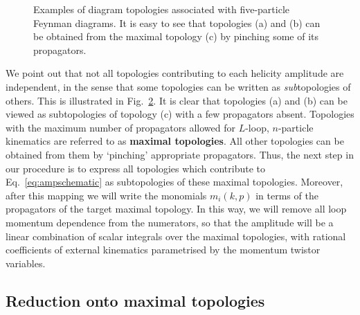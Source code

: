 \documentclass[main.tex]{subfiles}
\begin{document}
\begin{figure}
\begin{subfigure}[b]{0.3\textwidth}
    \caption{} \label{fig:topologyc}
    \end{subfigure}
\caption{Examples of diagram topologies associated with five-particle Feynman diagrams. It is easy to see that topologies (a) and (b) can be obtained from the maximal topology (c) by pinching some of its propagators.}
\label{fig:topologies}
\end{figure}

We point out that not all topologies contributing to each helicity amplitude are independent, in the sense that some topologies can be written as \textit{sub}topologies of others. This is illustrated in Fig.~\ref{fig:topologies}. It is clear that topologies (a) and (b) can be viewed as subtopologies of topology (c) with a few propagators absent. Topologies with the maximum number of propagators allowed for $L$-loop, $n$-particle kinematics are referred to as \textbf{maximal topologies}. All other topologies can be obtained from them by `pinching' appropriate propagators. Thus, the next step in our procedure is to express all topologies which contribute to Eq.~\ref{eq:ampschematic} as subtopologies of these maximal topologies. Moreover, after this mapping we will write the monomials $m_i(k, p)$ in terms of the propagators of the target maximal topology. In this way, we will remove all loop momentum dependence from the numerators, so that the amplitude will be a linear combination of scalar integrals over the maximal topologies, with rational coefficients of external kinematics parametrised by the momentum twistor variables.
\subsection{Reduction onto maximal topologies}
\end{document}
